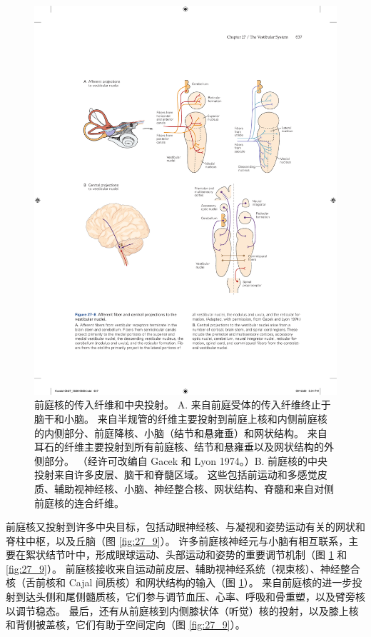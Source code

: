 \begin{figure}[htbp]
	\centering
	\includegraphics[width=0.8\linewidth]{chap27/fig_27_8}
	\caption{前庭核的传入纤维和中央投射。 A. 来自前庭受体的传入纤维终止于脑干和小脑。 来自半规管的纤维主要投射到前庭上核和内侧前庭核的内侧部分、前庭降核、小脑（结节和悬雍垂）和网状结构。 来自耳石的纤维主要投射到所有前庭核、结节和悬雍垂以及网状结构的外侧部分。 （经许可改编自 Gacek 和 Lyon 1974。）B. 前庭核的中央投射来自许多皮层、脑干和脊髓区域。 这些包括前运动和多感觉皮质、辅助视神经核、小脑、神经整合核、网状结构、脊髓和来自对侧前庭核的连合纤维。}
	\label{fig:27_8}
\end{figure}

前庭核又投射到许多中央目标，包括动眼神经核、与凝视和姿势运动有关的网状和脊柱中枢，以及丘脑（图 \ref{fig:27_9}）。 
许多前庭核神经元与小脑有相互联系，主要在絮状结节叶中，形成眼球运动、头部运动和姿势的重要调节机制（图 \ref{fig:27_8} 和 \ref{fig:27_9}）。 前庭核接收来自运动前皮层、辅助视神经系统（视束核）、神经整合核（舌前核和 Cajal 间质核）和网状结构的输入（图 \ref{fig:27_8}）。 来自前庭核的进一步投射到达头侧和尾侧髓质核，它们参与调节血压、心率、呼吸和骨重塑，以及臂旁核以调节稳态。 最后，还有从前庭核到内侧膝状体（听觉）核的投射，以及膝上核和背侧被盖核，它们有助于空间定向（图 \ref{fig:27_9}）。

